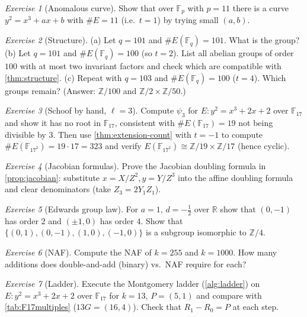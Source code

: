 \documentclass[11pt,a4paper,oneside]{book}
\theoremstyle{plain}
\theoremstyle{definition}
\theoremstyle{remark}
\newtheorem{exercise}{Exercise}[chapter]
\newcommand{\Z}{\mathbb{Z}}
\newcommand{\R}{\mathbb{R}}
\newcommand{\F}{\mathbb{F}}
\begin{document}
\begin{exercise}[Anomalous curve]
Show that over $\F_{p}$ with $p=11$ there is a curve $y^2=x^3+ax+b$ with $\#E=11$ (i.e.\ $t=1$) by trying small $(a,b)$.
\end{exercise}

\begin{exercise}[Structure]
(a) Let $q=101$ and $\#E(\F_q)=101$. What is the group? (b) Let $q=101$ and $\#E(\F_q)=100$ (so $t=2$). List all abelian groups of order $100$ with at most two invariant factors and check which are compatible with \cref{thm:structure}. (c) Repeat with $q=103$ and $\#E(\F_q)=100$ ($t=4$). Which groups remain? (Answer: $\Z/100$ and $\Z/2\times\Z/50$.)
\end{exercise}

\begin{exercise}[Schoof by hand, $\ell=3$]
Compute $\psi_3$ for $E:y^2=x^3+2x+2$ over $\F_{17}$ and show it has no root in $\F_{17}$, consistent with $\#E(\F_{17})=19$ not being divisible by $3$. Then use \cref{thm:extension-count} with $t=-1$ to compute $\#E(\F_{17^2})=19\cdot17=323$ and verify $E(\F_{17^2})\cong\Z/19\times\Z/17$ (hence cyclic).
\end{exercise}

\begin{exercise}[Jacobian formulas]
Prove the Jacobian doubling formula in \cref{prop:jacobian}: substitute $x=X/Z^2,y=Y/Z^3$ into the affine doubling formula and clear denominators (take $Z_3=2Y_1Z_1$).
\end{exercise}

\begin{exercise}[Edwards group law]
For $a=1$, $d=-\tfrac12$ over $\R$ show that $(0,-1)$ has order $2$ and $(\pm1,0)$ has order $4$. Show that $\{(0,1),(0,-1),(1,0),(-1,0)\}$ is a subgroup isomorphic to $\Z/4$.
\end{exercise}

\begin{exercise}[NAF]
Compute the NAF of $k=255$ and $k=1000$. How many additions does double-and-add (binary) vs.\ NAF require for each?
\end{exercise}

\begin{exercise}[Ladder]
Execute the Montgomery ladder (\cref{alg:ladder}) on $E:y^2=x^3+2x+2$ over $\F_{17}$ for $k=13$, $P=(5,1)$ and compare with \cref{tab:F17multiples} ($13G=(16,4)$). Check that $R_1-R_0=P$ at each step.
\end{exercise}
\end{document}

